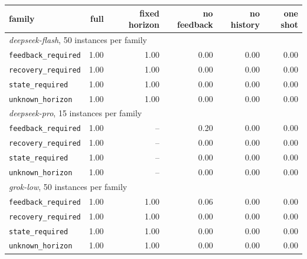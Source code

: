 \begin{tabular}{lrrrrr}
\toprule
family & full & fixed horizon & no feedback & no history & one shot \\
\midrule
\multicolumn{6}{l}{\emph{deepseek-flash}, 50 instances per family} \\
\texttt{feedback\_required} & 1.00 & 1.00 & 0.00 & 0.00 & 0.00 \\
\texttt{recovery\_required} & 1.00 & 1.00 & 0.00 & 0.00 & 0.00 \\
\texttt{state\_required} & 1.00 & 1.00 & 0.00 & 0.00 & 0.00 \\
\texttt{unknown\_horizon} & 1.00 & 1.00 & 0.00 & 0.00 & 0.00 \\
\midrule
\multicolumn{6}{l}{\emph{deepseek-pro}, 15 instances per family} \\
\texttt{feedback\_required} & 1.00 & -- & 0.20 & 0.00 & 0.00 \\
\texttt{recovery\_required} & 1.00 & -- & 0.00 & 0.00 & 0.00 \\
\texttt{state\_required} & 1.00 & -- & 0.00 & 0.00 & 0.00 \\
\texttt{unknown\_horizon} & 1.00 & -- & 0.00 & 0.00 & 0.00 \\
\midrule
\multicolumn{6}{l}{\emph{grok-low}, 50 instances per family} \\
\texttt{feedback\_required} & 1.00 & 1.00 & 0.06 & 0.00 & 0.00 \\
\texttt{recovery\_required} & 1.00 & 1.00 & 0.00 & 0.00 & 0.00 \\
\texttt{state\_required} & 1.00 & 1.00 & 0.00 & 0.00 & 0.00 \\
\texttt{unknown\_horizon} & 1.00 & 1.00 & 0.00 & 0.00 & 0.00 \\
\bottomrule
\end{tabular}
